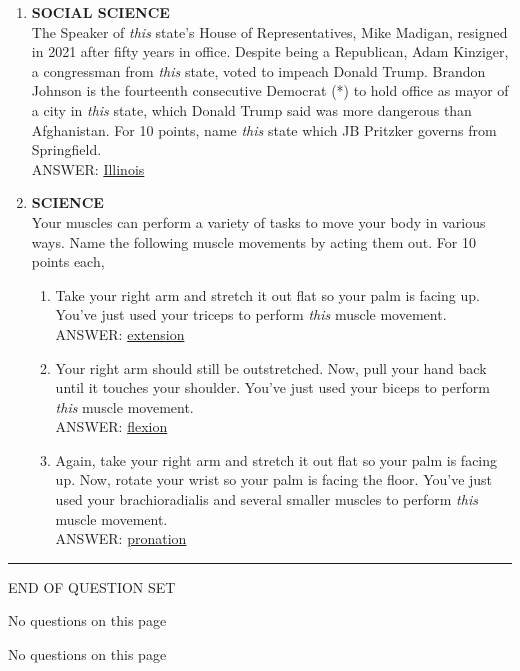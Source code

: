 \documentclass{report}
\newcommand*{\backtrack}{\setcounter{enumi}{\numexpr\theenumi-1\relax}}
\begin{document}
\begin{enumerate}
    \item \textbf{SOCIAL SCIENCE} \\ The Speaker of \textit{this} state's House of Representatives, Mike Madigan, resigned in 2021 after fifty years in office. Despite being a Republican, Adam Kinziger, a congressman from \textit{this} state, voted to impeach Donald Trump. Brandon Johnson is the fourteenth consecutive Democrat (*) to hold office as mayor of a city in \textit{this} state, which Donald Trump said was more dangerous than Afghanistan. For 10 points, name \textit{this} state which JB Pritzker governs from Springfield. \\ ANSWER: \underline{Illinois} \backtrack
    \item \textbf{SCIENCE} \\ Your muscles can perform a variety of tasks to move your body in various ways. Name the following muscle movements by acting them out. For 10 points each,
    \begin{enumerate}[label=\Alph*]
        \item Take your right arm and stretch it out flat so your palm is facing up. You've just used your triceps to perform \textit{this} muscle movement. \\ ANSWER: \underline{extension}
        \item Your right arm should still be outstretched. Now, pull your hand back until it touches your shoulder. You've just used your biceps to perform \textit{this} muscle movement. \\ ANSWER: \underline{flexion}
        \item Again, take your right arm and stretch it out flat so your palm is facing up. Now, rotate your wrist so your palm is facing the floor. You've just used your brachioradialis and several smaller muscles to perform \textit{this} muscle movement. \\ ANSWER: \underline{pronation}
    \end{enumerate}

\end{enumerate}


\vspace*{0.5 cm}
\centering
\rule{10 cm}{0.4pt}

\Large
END OF QUESTION SET
\newpage

\vspace*{\fill}
\centering
\thispagestyle{empty}
\Large
No questions on this page
\vspace*{\fill}

\newpage

\vspace*{\fill}
\centering
\thispagestyle{empty}
\Large
No questions on this page
\vspace*{\fill}
\end{document}
